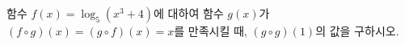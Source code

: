 함수 $f(x)=\log_5 (x^{3}+4)$에 대하여 함수 $g(x)$가 $(f\circ g)(x)=(g\circ f)(x)=x$를 만족시킬 때, $(g\circ g)(1)$의 값을 구하시오.
